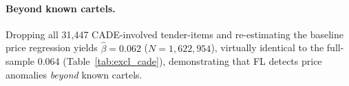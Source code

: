 \paragraph{Beyond known cartels.}
Dropping all 31,447 CADE-involved tender-items and re-estimating the
baseline price regression yields $\hat{\beta} = 0.062$ ($N =
1{,}622{,}954$), virtually identical to the full-sample 0.064
(Table~\ref{tab:excl_cade}), demonstrating that FL detects price
anomalies \emph{beyond} known cartels.

